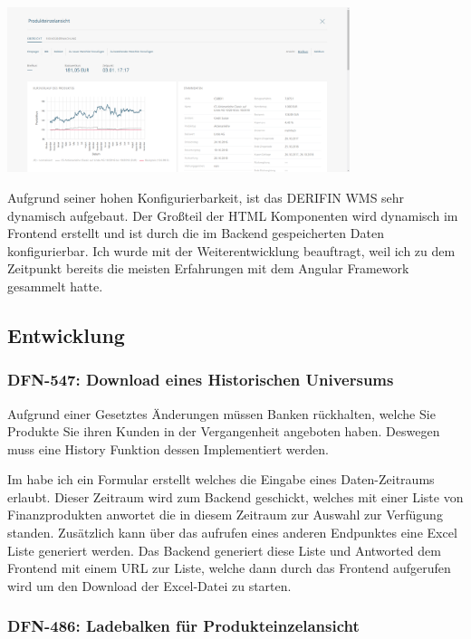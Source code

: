 \documentclass[chapterprefix=false, 12pt, a4paper, oneside, parskip=half, listof=totoc, bibliography=totoc, numbers=noendperiod]{scrbook}
\begin{document}
    \begin{center}
        \includegraphics[width=0.75\textwidth]{img/derifin.png}
    \end{center}

    Aufgrund seiner hohen Konfigurierbarkeit, ist das DERIFIN WMS sehr dynamisch aufgebaut. Der Großteil der HTML Komponenten
    wird dynamisch im Frontend erstellt und ist durch die im Backend gespeicherten Daten konfigurierbar. Ich wurde mit
    der Weiterentwicklung beauftragt, weil ich zu dem Zeitpunkt bereits die meisten Erfahrungen mit dem Angular Framework gesammelt hatte.

    \subsection{Entwicklung}

    \subsubsection{DFN-547: Download eines Historischen Universums}

    Aufgrund einer Gesetztes Änderungen müssen Banken rückhalten, welche Sie Produkte Sie ihren Kunden in der Vergangenheit
    angeboten haben. Deswegen muss eine History Funktion dessen Implementiert werden.

    Im habe ich ein Formular erstellt welches die Eingabe eines Daten-Zeitraums erlaubt. Dieser Zeitraum wird zum
    Backend geschickt, welches mit einer Liste von Finanzprodukten anwortet die in diesem Zeitraum zur Auswahl zur Verfügung
    standen. Zusätzlich kann über das aufrufen eines anderen Endpunktes eine Excel Liste generiert werden. Das Backend generiert
    diese Liste und Antworted dem Frontend mit einem URL zur Liste, welche dann durch das Frontend aufgerufen wird um den
    Download der Excel-Datei zu starten.

    \subsubsection{DFN-486: Ladebalken für Produkteinzelansicht}
\end{document}
